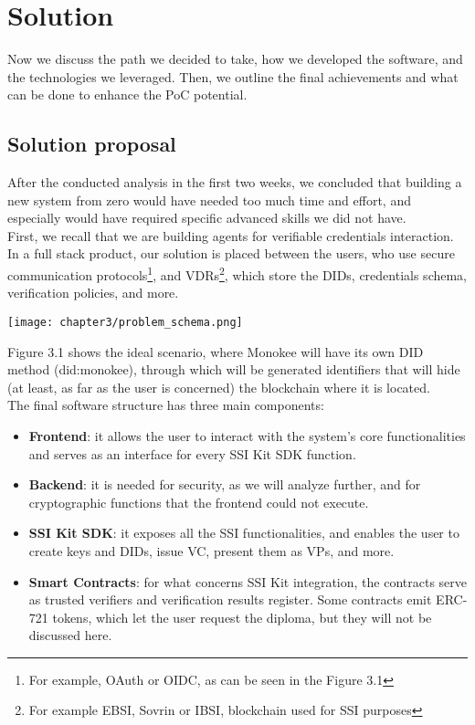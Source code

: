 
\chapter{Solution}
Now we discuss the path we decided to take, how we developed the software, 
and the technologies we leveraged. Then, we outline the final achievements 
and what can be done to enhance the PoC potential.
\section{Solution proposal}
After the conducted analysis in the first two weeks, we concluded that building a 
new system from zero would have needed too much time and effort, and especially would 
have required specific advanced skills we did not have.\\
First, we recall that we are building agents for verifiable credentials interaction. 
In a full stack product, our solution is placed between the users, who use secure 
communication protocols\footnote{For example, OAuth or OIDC, as can be seen in the
Figure 3.1},  and VDRs\footnote{For example EBSI, Sovrin or IBSI, blockchain used for
SSI purposes}, which store the DIDs, credentials schema, verification policies, 
and more.
\begin{center}
    \texttt{[image: chapter3/problem\_schema.png]}
\end{center}
\vspace*{0.5cm}
Figure 3.1 shows the ideal scenario, where Monokee will have its own DID method
(did:monokee), through which will be generated identifiers that will hide (at least,
as far as the user is concerned) the blockchain where it is located.
\vspace*{0.3cm}\\
The final software structure has three main components:
\begin{itemize}
    \item \textbf{Frontend}: it allows the user to interact with the system's core 
    functionalities and serves as an interface for every SSI Kit SDK function.
    \item \textbf{Backend}: it is needed for security, as we will analyze 
    further, and for cryptographic functions that the frontend could not execute.
    \item \textbf{SSI Kit SDK}: it exposes all the SSI functionalities, and enables 
    the user to create keys and DIDs, issue VC, present them as VPs, and more.
    \item \textbf{Smart Contracts}: for what concerns SSI Kit integration, the 
    contracts serve as trusted verifiers and verification results register. Some 
    contracts emit ERC-721 tokens, which let the user request the diploma, but they 
    will not be discussed here.
\end{itemize}
